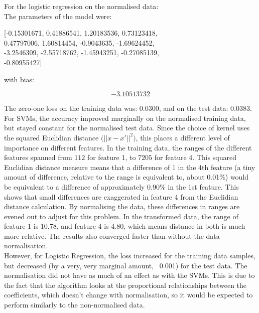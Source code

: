 \documentclass{scrartcl}
\begin{document}
For the logistic regression on the normalised data:\\

The parameters of the model were:

\begin{center}
 [-0.15301671,  0.41886541,  1.20183536,  0.73123418, \\
   0.47797006,  1.60814454, -0.9043635, -1.69624452, \\
  -3.2546309, -2.55718762, -1.45943251, -0.27085139, \\
  -0.80955427]
\end{center}

with bias:

\[ -3.10513732 \]

The zero-one loss on the training data was: $0.0300$, and on the test data: $0.0383$. \\

For SVMs, the accuracy improved marginally on the normalised training data, but stayed constant for the normalised test data. Since the choice of kernel uses the squared Euclidian distance $\big( || x - x' || ^2 \big)$, this places a different level of importance on different features. In the training data, the ranges of the different features spanned from $112$ for feature 1, to $7205$ for feature 4. This squared Euclidian distance measure means that a difference of 1 in the 4th feature (a tiny amount of difference, relative to the range is equivalent to, about 0.01\%) would be equivalent to a difference of approximately 0.90\% in the 1st feature. This shows that small differences are exaggerated in feature 4 from the Euclidian distance calculation. By normalising the data, these differences in ranges are evened out to adjust for this problem. In the transformed data, the range of feature 1 is 10.78, and feature 4 is 4.80, which means distance in both is much more relative. The results also converged faster than without the data normalisation. \\

However, for Logistic Regression, the loss increased for the training data samples, but decreased (by a very, very marginal amount, ~0.001) for the test data. The normalisation did not have as much of an effect as with the SVMs. This is due to the fact that the algorithm looks at the proportional relationships between the coefficients, which doesn't change with normalisation, so it would be expected to perform similarly to the non-normalised data. \\
\end{document}
